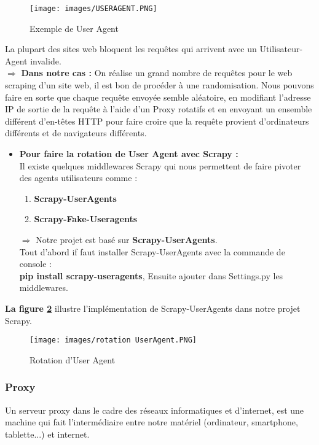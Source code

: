 \begin{figure}[H]
            \centering
            \texttt{[image: images/USERAGENT.PNG]}
            \caption{Exemple de User Agent}
            \label{fig:User Agent1}  
        \end{figure}
La plupart des sites web bloquent les requêtes qui arrivent avec un Utilisateur-Agent invalide.\\
$\Rightarrow$ \textbf{Dans notre cas :} On réalise un grand nombre de requêtes  pour le web scraping d’un site web, il est bon de procéder à une randomisation. Nous pouvons faire en sorte que chaque requête  envoyée semble aléatoire, en modifiant l'adresse IP de sortie de la requête à l'aide d’un Proxy rotatifs et en envoyant un ensemble différent d'en-têtes HTTP pour faire croire que la requête provient d'ordinateurs différents et de navigateurs différents.
\begin{itemize}[label=,font=\normalsize]
        \addtolength{\itemindent}{0cm}
        \item\textbf{Pour faire la rotation de User Agent avec Scrapy : }\\ Il existe quelques middlewares Scrapy qui nous permettent de faire pivoter des agents utilisateurs comme :
        \begin{enumerate}
            \item\textbf{Scrapy-UserAgents} 
            \item\textbf{Scrapy-Fake-Useragents}   
        \end{enumerate}
        \vspace{1cm}
        $\Rightarrow$ Notre projet est basé sur \textbf{Scrapy-UserAgents}.\\ Tout d’abord if faut installer Scrapy-UserAgents  avec la commande de console :\\\textbf{pip install scrapy-useragents}, Ensuite ajouter dans Settings.py les middlewares.
        \end{itemize}
        \vspace{1cm}
\textbf{La figure \ref{fig:User Agent}} illustre l’implémentation de Scrapy-UserAgents dans notre projet Scrapy.
\begin{figure}[H]
            \centering
            \texttt{[image: images/rotation UserAgent.PNG]}
            \caption{Rotation d'User Agent}
            \label{fig:User Agent}  
        \end{figure}
\subsubsection{Proxy} Un serveur proxy \textbf{\cite{proxy}} dans le cadre des réseaux informatiques et d'internet, est une machine qui fait l'intermédiaire entre notre matériel (ordinateur, smartphone, tablette...) et internet.

